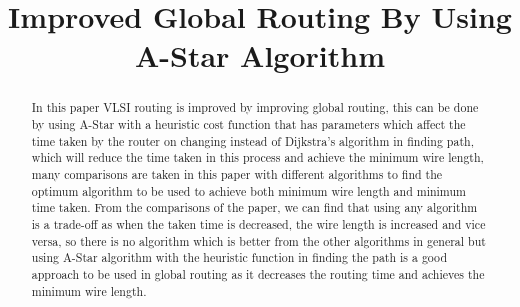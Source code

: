 \documentclass[conference]{IEEEtran}
\begin{document}

\title{Improved Global Routing By Using A-Star Algorithm\\}


\author{
}


\maketitle


\begin{abstract}
    In this paper VLSI routing is improved by improving global routing, this can be done by using A-Star with a heuristic cost function that has parameters which affect the time taken by the router on changing instead of Dijkstra's algorithm in finding path, which will reduce the time taken in this process and achieve the minimum wire length, many comparisons are taken in this paper with different algorithms to find the optimum algorithm to be used to achieve both minimum wire length and minimum time taken. From the comparisons of the paper, we can find that using any algorithm is a trade-off as when the taken time is decreased, the wire length is increased and vice versa, so there is no algorithm which is better from the other algorithms in general but using A-Star algorithm with the heuristic function in finding the path is a good approach to be used in global routing as it decreases the routing time and achieves the minimum wire length.
\end{abstract}
\end{document}
